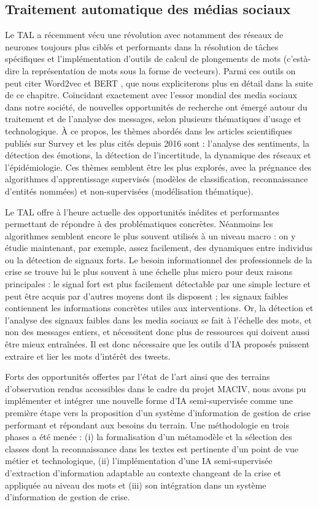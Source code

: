 \subsection*{Traitement automatique des médias sociaux}
Le TAL a récemment vécu une révolution avec notamment des réseaux de neurones toujours plus ciblés et performants dans la résolution de tâches spécifiques et l'implémentation d'outils de calcul de plongements de mots (c'està-dire la représentation de mots sous la forme de vecteurs).
Parmi ces outils on peut citer Word2vec \parencite{mikolovDistributedRepresentationsWords2013} et BERT \parencite{devlinBERTPretrainingDeep2018}, que nous expliciterons plus en détail dans la suite de ce chapitre.
Coïncidant exactement avec l'essor mondial des media sociaux dans notre société, de nouvelles opportunités de recherche
ont émergé autour du traitement et de l'analyse des messages, selon plusieurs
thématiques d'usage et technologique.
À ce propos, les thèmes abordés dans les articles scientifiques publiés sur Survey et les plus cités depuis 2016 sont : l'analyse des sentiments, la détection des émotions, la détection de l'incertitude,
la dynamique des réseaux et l'épidémiologie.
Ces thèmes semblent être les plus explorés, avec la prégnance des algorithmes d'apprentissage supervisés (modèles de classification, reconnaissance d'entités nommées) et non-supervisées (modélisation thématique).

Le TAL offre à l'heure actuelle des opportunités inédites et performantes permettant de répondre à des problématiques concrètes.
Néanmoins les algorithmes semblent encore le plus souvent utilisés à un niveau macro : on y étudie maintenant, par exemple, assez facilement, des dynamiques entre individus ou la détection de signaux forts.
Le besoin informationnel des professionnels de la crise se trouve lui le plus souvent à une échelle plus micro pour deux raisons principales : le signal fort est plus facilement détectable par une simple lecture et peut être acquis par d'autres moyens dont ils disposent ; les signaux faibles
contiennent les informations concrètes utiles aux interventions.
Or, la détection et l'analyse des signaux faibles dans les media sociaux se fait à l'échelle des mots, et non des messages entiers, et nécessitent donc plus de ressources qui doivent aussi être mieux entraînées.
Il est donc nécessaire que les outils d'IA proposés puissent extraire et lier les mots d'intérêt des tweets.

Forts des opportunités offertes par l'état de l'art ainsi que des terrains d'observation rendus accessibles dans le cadre du projet MACIV, nous avons pu implémenter et intégrer une nouvelle forme d'IA semi-supervisée comme une première étape
vers la proposition d'un système d'information de gestion de crise performant et
répondant aux besoins du terrain.
Une méthodologie en trois phases a été menée :
(i) la formalisation d'un métamodèle et la sélection des classes dont la reconnaissance dans les textes est pertinente d'un point de vue métier et technologique,
(ii) l'implémentation d'une IA semi-supervisée d'extraction d'information adaptable au contexte changeant de la crise et appliquée au niveau des mots et
(iii) son intégration dans un système d'information de gestion de crise.

